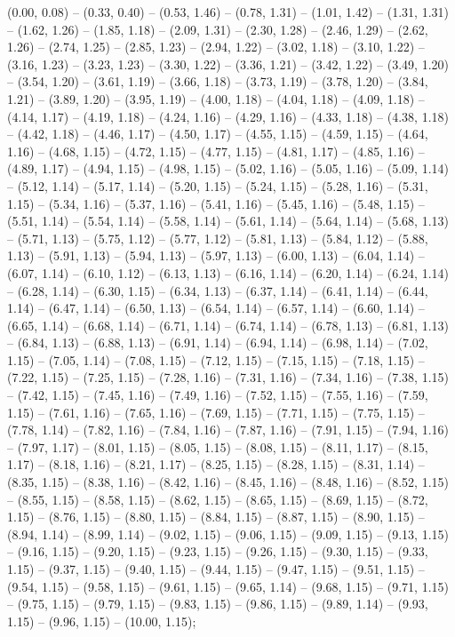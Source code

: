 (0.00,	0.08) --
(0.33,	0.40) --
(0.53,	1.46) --
(0.78,	1.31) --
(1.01,	1.42) --
(1.31,	1.31) --
(1.62,	1.26) --
(1.85,	1.18) --
(2.09,	1.31) --
(2.30,	1.28) --
(2.46,	1.29) --
(2.62,	1.26) --
(2.74,	1.25) --
(2.85,	1.23) --
(2.94,	1.22) --
(3.02,	1.18) --
(3.10,	1.22) --
(3.16,	1.23) --
(3.23,	1.23) --
(3.30,	1.22) --
(3.36,	1.21) --
(3.42,	1.22) --
(3.49,	1.20) --
(3.54,	1.20) --
(3.61,	1.19) --
(3.66,	1.18) --
(3.73,	1.19) --
(3.78,	1.20) --
(3.84,	1.21) --
(3.89,	1.20) --
(3.95,	1.19) --
(4.00,	1.18) --
(4.04,	1.18) --
(4.09,	1.18) --
(4.14,	1.17) --
(4.19,	1.18) --
(4.24,	1.16) --
(4.29,	1.16) --
(4.33,	1.18) --
(4.38,	1.18) --
(4.42,	1.18) --
(4.46,	1.17) --
(4.50,	1.17) --
(4.55,	1.15) --
(4.59,	1.15) --
(4.64,	1.16) --
(4.68,	1.15) --
(4.72,	1.15) --
(4.77,	1.15) --
(4.81,	1.17) --
(4.85,	1.16) --
(4.89,	1.17) --
(4.94,	1.15) --
(4.98,	1.15) --
(5.02,	1.16) --
(5.05,	1.16) --
(5.09,	1.14) --
(5.12,	1.14) --
(5.17,	1.14) --
(5.20,	1.15) --
(5.24,	1.15) --
(5.28,	1.16) --
(5.31,	1.15) --
(5.34,	1.16) --
(5.37,	1.16) --
(5.41,	1.16) --
(5.45,	1.16) --
(5.48,	1.15) --
(5.51,	1.14) --
(5.54,	1.14) --
(5.58,	1.14) --
(5.61,	1.14) --
(5.64,	1.14) --
(5.68,	1.13) --
(5.71,	1.13) --
(5.75,	1.12) --
(5.77,	1.12) --
(5.81,	1.13) --
(5.84,	1.12) --
(5.88,	1.13) --
(5.91,	1.13) --
(5.94,	1.13) --
(5.97,	1.13) --
(6.00,	1.13) --
(6.04,	1.14) --
(6.07,	1.14) --
(6.10,	1.12) --
(6.13,	1.13) --
(6.16,	1.14) --
(6.20,	1.14) --
(6.24,	1.14) --
(6.28,	1.14) --
(6.30,	1.15) --
(6.34,	1.13) --
(6.37,	1.14) --
(6.41,	1.14) --
(6.44,	1.14) --
(6.47,	1.14) --
(6.50,	1.13) --
(6.54,	1.14) --
(6.57,	1.14) --
(6.60,	1.14) --
(6.65,	1.14) --
(6.68,	1.14) --
(6.71,	1.14) --
(6.74,	1.14) --
(6.78,	1.13) --
(6.81,	1.13) --
(6.84,	1.13) --
(6.88,	1.13) --
(6.91,	1.14) --
(6.94,	1.14) --
(6.98,	1.14) --
(7.02,	1.15) --
(7.05,	1.14) --
(7.08,	1.15) --
(7.12,	1.15) --
(7.15,	1.15) --
(7.18,	1.15) --
(7.22,	1.15) --
(7.25,	1.15) --
(7.28,	1.16) --
(7.31,	1.16) --
(7.34,	1.16) --
(7.38,	1.15) --
(7.42,	1.15) --
(7.45,	1.16) --
(7.49,	1.16) --
(7.52,	1.15) --
(7.55,	1.16) --
(7.59,	1.15) --
(7.61,	1.16) --
(7.65,	1.16) --
(7.69,	1.15) --
(7.71,	1.15) --
(7.75,	1.15) --
(7.78,	1.14) --
(7.82,	1.16) --
(7.84,	1.16) --
(7.87,	1.16) --
(7.91,	1.15) --
(7.94,	1.16) --
(7.97,	1.17) --
(8.01,	1.15) --
(8.05,	1.15) --
(8.08,	1.15) --
(8.11,	1.17) --
(8.15,	1.17) --
(8.18,	1.16) --
(8.21,	1.17) --
(8.25,	1.15) --
(8.28,	1.15) --
(8.31,	1.14) --
(8.35,	1.15) --
(8.38,	1.16) --
(8.42,	1.16) --
(8.45,	1.16) --
(8.48,	1.16) --
(8.52,	1.15) --
(8.55,	1.15) --
(8.58,	1.15) --
(8.62,	1.15) --
(8.65,	1.15) --
(8.69,	1.15) --
(8.72,	1.15) --
(8.76,	1.15) --
(8.80,	1.15) --
(8.84,	1.15) --
(8.87,	1.15) --
(8.90,	1.15) --
(8.94,	1.14) --
(8.99,	1.14) --
(9.02,	1.15) --
(9.06,	1.15) --
(9.09,	1.15) --
(9.13,	1.15) --
(9.16,	1.15) --
(9.20,	1.15) --
(9.23,	1.15) --
(9.26,	1.15) --
(9.30,	1.15) --
(9.33,	1.15) --
(9.37,	1.15) --
(9.40,	1.15) --
(9.44,	1.15) --
(9.47,	1.15) --
(9.51,	1.15) --
(9.54,	1.15) --
(9.58,	1.15) --
(9.61,	1.15) --
(9.65,	1.14) --
(9.68,	1.15) --
(9.71,	1.15) --
(9.75,	1.15) --
(9.79,	1.15) --
(9.83,	1.15) --
(9.86,	1.15) --
(9.89,	1.14) --
(9.93,	1.15) --
(9.96,	1.15) --
(10.00,	1.15);
